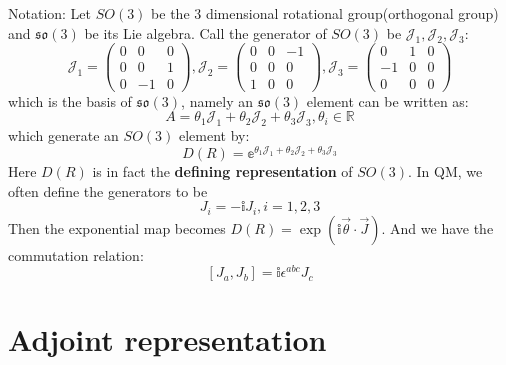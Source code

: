 \documentclass{article}
\begin{document}
	Notation: Let $SO( 3)$ be the $3$ dimensional rotational group(orthogonal group) and $\mathfrak{so}( 3)$ be its Lie algebra. Call the generator of $SO( 3)$ be $\mathcal{J}_{1} ,\mathcal{J}_{2} ,\mathcal{J}_{3}$:
	\begin{equation*}
		\mathcal{J}_{1} =\begin{pmatrix}
			0 & 0 & 0\\
			0 & 0 & 1\\
			0 & -1 & 0
		\end{pmatrix} ,\mathcal{J}_{2} =\begin{pmatrix}
			0 & 0 & -1\\
			0 & 0 & 0\\
			1 & 0 & 0
		\end{pmatrix} ,\mathcal{J}_{3} =\begin{pmatrix}
			0 & 1 & 0\\
			-1 & 0 & 0\\
			0 & 0 & 0
		\end{pmatrix}
	\end{equation*}
	which is the basis of $\mathfrak{so}( 3)$, namely an $\mathfrak{so}( 3)$ element can be written as:
	\begin{equation*}
		A=\theta _{1}\mathcal{J}_{1} +\theta _{2}\mathcal{J}_{2} +\theta _{3}\mathcal{J}_{3} ,\theta _{i} \in \mathbb{R}
	\end{equation*}
	which generate an $SO( 3)$ element by:
	\begin{equation*}
		D( R) =\mathbb{e}^{\theta _{1}\mathcal{J}_{1} +\theta _{2}\mathcal{J}_{2} +\theta _{3}\mathcal{J}_{3}}
	\end{equation*}
	Here $D( R)$ is in fact the \textbf{defining representation} of $SO( 3)$.	In QM, we often define the generators to be
	\begin{equation*}
		J_{i} =-\mathbb{i} J_{i} ,i=1,2,3
	\end{equation*}
	Then the exponential map becomes $D( R) =\exp(\mathbb{i}\vec{\theta } \cdot \vec{J})$. And we have the commutation relation:
	\begin{equation*}
		\boxed{[ J_{a} ,J_{b}] =\mathbb{i} \epsilon ^{abc} J_{c}}
	\end{equation*}
	\section{Adjoint representation}
	
\end{document}
